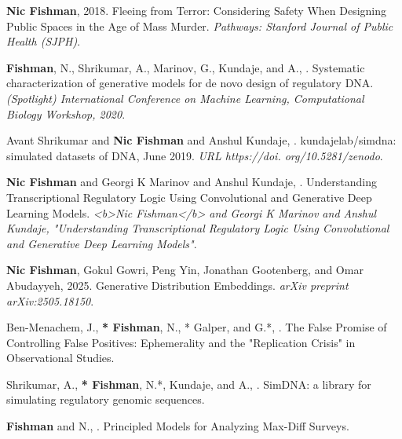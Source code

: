 \begin{cvparagraph}
\begin{addmargin}[2em]{0em}
\textbf{Nic Fishman}, 2018. Fleeing from Terror: Considering Safety When Designing Public Spaces in the Age of Mass Murder. \textit{Pathways: Stanford Journal of Public Health (SJPH)}.

\textbf{Fishman}, N., Shrikumar, A., Marinov, G., Kundaje, and A., . Systematic characterization of generative models for de novo design of regulatory DNA. \textit{(Spotlight) International Conference on Machine Learning, Computational Biology Workshop, 2020}.

Avant Shrikumar and \textbf{Nic Fishman} and Anshul Kundaje, . kundajelab/simdna: simulated datasets of DNA, June 2019. \textit{URL https://doi. org/10.5281/zenodo}.

\textbf{Nic Fishman} and Georgi K Marinov and Anshul Kundaje, . Understanding Transcriptional Regulatory Logic Using Convolutional and Generative Deep Learning Models. \textit{<b>Nic Fishman</b> and Georgi K Marinov and Anshul Kundaje, "Understanding Transcriptional Regulatory Logic Using Convolutional and Generative Deep Learning Models"}.

\end{addmargin}


\begin{addmargin}[2em]{0em}

\textbf{Nic Fishman}, Gokul Gowri, Peng Yin, Jonathan Gootenberg, and Omar Abudayyeh, 2025. Generative Distribution Embeddings. \textit{arXiv preprint arXiv:2505.18150}.

Ben-Menachem, J., \textbf{* Fishman}, N., * Galper, and G.*, . The False Promise of Controlling False Positives: Ephemerality and the "Replication Crisis" in Observational Studies.

Shrikumar, A., \textbf{* Fishman}, N.*, Kundaje, and A., . SimDNA: a library for simulating regulatory genomic sequences.

\textbf{Fishman} and N., . Principled Models for Analyzing Max-Diff Surveys.

\end{addmargin}

\end{cvparagraph}
